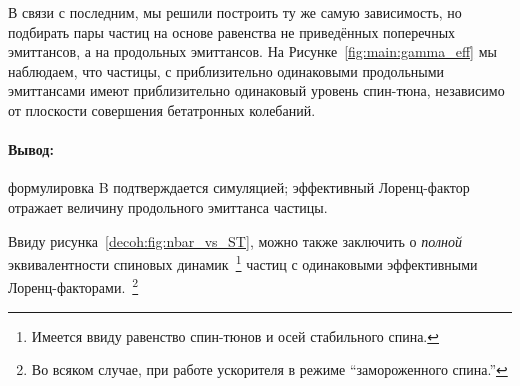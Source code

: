 В связи с последним, мы решили построить ту же самую зависимость, но подбирать пары частиц на основе равенства не приведённых поперечных эмиттансов, а на продольных эмиттансов. На Рисунке~\ref{fig:main:gamma_eff} мы наблюдаем, что частицы, с приблизительно одинаковыми продольными эмиттансами имеют приблизительно одинаковый уровень спин-тюна, независимо от плоскости совершения бетатронных колебаний.

\paragraph{Вывод:} формулировка B подтверждается симуляцией; эффективный Лоренц-фактор отражает величину продольного эмиттанса частицы.

Ввиду рисунка~\ref{decoh:fig:nbar_vs_ST}, можно также заключить о \emph{полной} эквивалентности спиновых динамик~\footnote{Имеется ввиду равенство спин-тюнов и осей стабильного спина.} частиц с одинаковыми эффективными Лоренц-факторами.~\footnote{Во всяком случае, при работе ускорителя в режиме ``замороженного спина.''}
